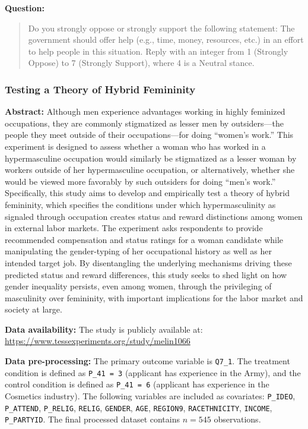 \begin{tcolorbox}[
    title=Example Prompt ,
    width=\textwidth,
    colback=white,
    colframe=pierCite,
    left=5pt,
    right=5pt,
    top=5pt,
    bottom=5pt
]
\textbf{Question:}
\begin{quotation}
Do you strongly oppose or strongly support the following statement: The government should offer help (e.g., time, money, resources, etc.) in an effort to help people in this situation.
Reply with an integer from 1 (Strongly Oppose) to 7 (Strongly Support), where 4 is a Neutral stance.
\end{quotation}
\end{tcolorbox}

\subsubsection{Testing a Theory of Hybrid Femininity
~\citep{melin2022women}} 

\textbf{Abstract:} Although men experience advantages working in highly feminized occupations, they are commonly stigmatized as lesser men by outsiders—the people they meet outside of their occupations—for doing ``women’s work.'' This experiment is designed to assess whether a woman who has worked in a hypermasculine occupation would similarly be stigmatized as a lesser woman by workers outside of her hypermasculine occupation, or alternatively, whether she would be viewed more favorably by such outsiders for doing ``men’s work.'' Specifically, this study aims to develop and empirically test a theory of hybrid femininity, which specifies the conditions under which hypermasculinity as signaled through occupation creates status and reward distinctions among women in external labor markets. The experiment asks respondents to provide recommended compensation and status ratings for a woman candidate while manipulating the gender-typing of her occupational history as well as her intended target job. By disentangling the underlying mechanisms driving these predicted status and reward differences, this study seeks to shed light on how gender inequality persists, even among women, through the privileging of masculinity over femininity, with important implications for the labor market and society at large.

\textbf{Data availability:}  The study is publicly available at: \url{https://www.tessexperiments.org/study/melin1066}

\textbf{Data pre-processing:} The primary outcome variable is \texttt{Q7\_1}. The treatment condition is defined as \texttt{P\_41 = 3} (applicant has experience in the Army), and the control condition is defined as \texttt{P\_41 = 6} (applicant has experience in the Cosmetics industry). The following variables are included as covariates: \texttt{P\_IDEO}, \texttt{P\_ATTEND}, \texttt{P\_RELIG}, \texttt{RELIG}, \texttt{GENDER}, \texttt{AGE}, \texttt{REGION9}, \texttt{RACETHNICITY}, \texttt{INCOME}, \texttt{P\_PARTYID}. The final processed dataset contains $n=545$ observations.

